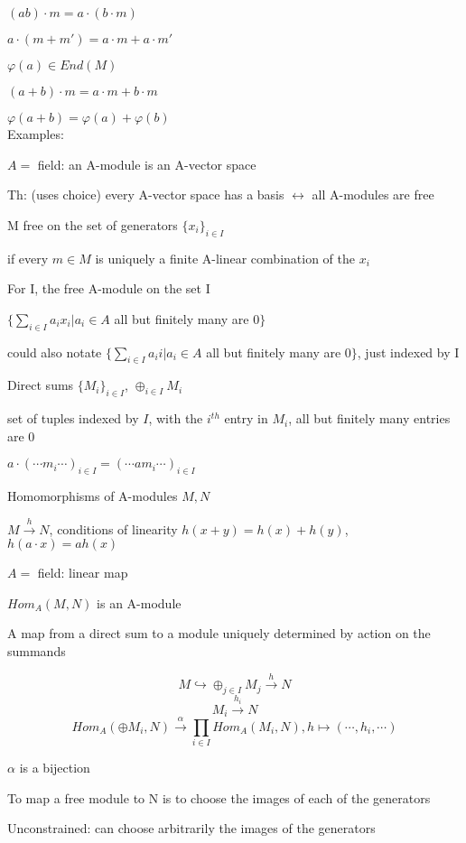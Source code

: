 \documentclass[12pt]{article}
\begin{document}
$(ab) \cdot m = a \cdot (b \cdot m)$

$a \cdot (m + m') = a \cdot m + a \cdot m'$

$\varphi(a) \in End(M)$

$(a + b) \cdot m = a \cdot m + b \cdot m$

$\varphi(a + b) = \varphi(a) + \varphi(b)$\\

\noindent
Examples:

$A =$ field: an A-module is an A-vector space

Th: (uses choice) every A-vector space has a basis $\leftrightarrow$ all A-modules are free

\noindent
M free on the set of generators $\{x_i\}_{i \in I}$

if every $m \in M$ is uniquely a finite A-linear combination of the $x_i$

\noindent
For I, the free A-module on the set I

$\{\sum_{i \in I}a_ix_i | a_i \in A$ all but finitely many are 0$\}$

could also notate $\{\sum_{i \in I}a_ii | a_i \in A$ all but finitely many are 0$\}$, just indexed by I

\noindent
Direct sums $\{M_i\}_{i \in I}$, $\oplus_{i \in I}M_i$

set of tuples indexed by $I$, with the $i^{th}$ entry in $M_i$, all but finitely many entries are 0

$a \cdot (\cdots m_i \cdots)_{i \in I} = (\cdots am_i \cdots)_{i \in I}$

\noindent
Homomorphisms of A-modules $M, N$

$M \xrightarrow{h} N$, conditions of linearity $h(x + y) = h(x) + h(y)$, $h(a \cdot x) = a h(x)$

$A =$ field: linear map

$Hom_A(M, N)$ is an A-module

\noindent
A map from a direct sum to a module uniquely determined by action on the summands

$$M \hookrightarrow \oplus_{j \in I}M_j \xrightarrow{h} N$$ $$M_i \xrightarrow{h_i} N$$ $$Hom_A(\oplus M_i, N) \xrightarrow{\alpha} \prod_{i \in I} Hom_A(M_i, N), h \mapsto (\cdots, h_i, \cdots)$$

$\alpha$ is a bijection

To map a free module to N is to choose the images of each of the generators

Unconstrained: can choose arbitrarily the images of the generators\\
\end{document}
